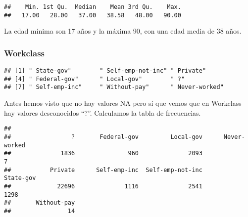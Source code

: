 \documentclass[]{article}
\newenvironment{Shaded}{\begin{snugshade}}{\end{snugshade}}
\newcommand{\KeywordTok}[1]{\textcolor[rgb]{0.94,0.87,0.69}{#1}}
\newcommand{\NormalTok}[1]{\textcolor[rgb]{0.80,0.80,0.80}{#1}}
\newcommand{\OperatorTok}[1]{\textcolor[rgb]{0.94,0.94,0.82}{#1}}
\begin{document}
\begin{Shaded}
\end{Shaded}

\begin{verbatim}
##    Min. 1st Qu.  Median    Mean 3rd Qu.    Max. 
##   17.00   28.00   37.00   38.58   48.00   90.00
\end{verbatim}

La edad mínima son 17 años y la máxima 90, con una edad media de 38
años.

\hypertarget{workclass}{%
\subsubsection{Workclass}\label{workclass}}

\begin{Shaded}
\end{Shaded}

\begin{verbatim}
## [1] " State-gov"        " Self-emp-not-inc" " Private"         
## [4] " Federal-gov"      " Local-gov"        " ?"               
## [7] " Self-emp-inc"     " Without-pay"      " Never-worked"
\end{verbatim}

Antes hemos visto que no hay valores NA pero sí que vemos que en
Workclass hay valores desconocidos ``?''. Calculamos la tabla de
frecuencias.

\begin{Shaded}
\end{Shaded}

\begin{verbatim}
## 
##                 ?       Federal-gov         Local-gov      Never-worked 
##              1836               960              2093                 7 
##           Private      Self-emp-inc  Self-emp-not-inc         State-gov 
##             22696              1116              2541              1298 
##       Without-pay 
##                14
\end{verbatim}
\end{document}
